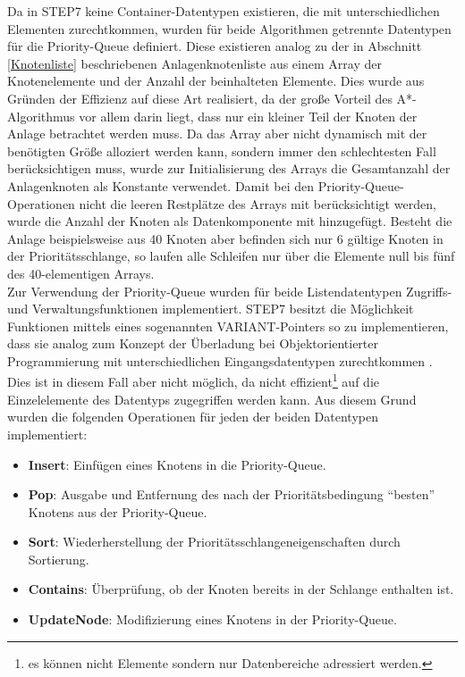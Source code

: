 			Da in \ac{STEP7} keine Container-Datentypen existieren, die mit unterschiedlichen Elementen zurechtkommen, wurden für beide Algorithmen getrennte Datentypen für die Priority-Queue definiert. Diese existieren analog zu der in Abschnitt \ref{Knotenliste} beschriebenen Anlagenknotenliste aus einem Array der Knotenelemente und der Anzahl der beinhalteten Elemente. Dies wurde aus Gründen der Effizienz auf diese Art realisiert, da der große Vorteil des A*-Algorithmus vor allem darin liegt, dass nur ein kleiner Teil der Knoten der Anlage betrachtet werden muss. Da das Array aber nicht dynamisch mit der benötigten Größe alloziert werden kann, sondern immer den schlechtesten Fall berücksichtigen muss, wurde zur Initialisierung des Arrays die Gesamtanzahl der Anlagenknoten als Konstante verwendet. Damit  bei den Priority-Queue-Operationen nicht die leeren Restplätze des Arrays mit berücksichtigt werden, wurde die Anzahl der Knoten als Datenkomponente mit hinzugefügt. Besteht die Anlage beispielsweise aus 40 Knoten aber befinden sich nur 6 gültige Knoten in der Prioritätsschlange, so laufen alle Schleifen nur über die Elemente null bis fünf des 40-elementigen Arrays.
			\\[4pt]
			Zur Verwendung der Priority-Queue wurden für beide Listendatentypen Zugriffs- und Verwaltungsfunktionen implementiert. \ac{STEP7} besitzt die Möglichkeit Funktionen mittels eines sogenannten VARIANT-Pointers so zu implementieren, dass sie analog zum Konzept der Überladung bei Objektorientierter Programmierung mit unterschiedlichen Eingangsdatentypen zurechtkommen \cite{STEP7Prog}. Dies ist in diesem Fall aber nicht möglich, da nicht effizient\footnote{es können nicht Elemente sondern nur Datenbereiche adressiert werden.} auf die Einzelelemente des Datentyps zugegriffen werden kann. Aus diesem Grund wurden die folgenden Operationen für jeden der beiden Datentypen implementiert:
			
			\begin{itemize}
				\item \textbf{Insert}: Einfügen eines Knotens in die Priority-Queue.
				\item \textbf{Pop}: Ausgabe und Entfernung des nach der Prioritätsbedingung "`besten"' Knotens aus der Priority-Queue.
				\item \textbf{Sort}: Wiederherstellung der Prioritätsschlangeneigenschaften durch Sortierung.
				\item \textbf{Contains}: Überprüfung, ob der Knoten bereits in der Schlange enthalten ist.
				\item \textbf{UpdateNode}: Modifizierung eines Knotens in der Priority-Queue.
			\end{itemize}
			
